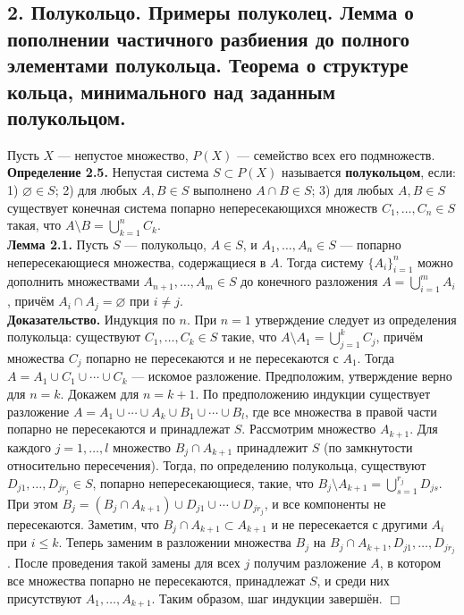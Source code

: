 \documentclass[12pt]{article}
\begin{document}
\subsection*{2. Полукольцо. Примеры полуколец. Лемма о пополнении частичного разбиения до
полного элементами полукольца. Теорема о структуре кольца, минимального над
заданным полукольцом.}
Пусть $X$ — непустое множество, $P(X)$ — семейство всех его подмножеств. \\\textbf{Определение 2.5.} Непустая система $S \subset P(X)$ называется \textbf{полукольцом}, если: 1) $\varnothing \in S$; 2) для любых $A, B \in S$ выполнено $A \cap B \in S$; 3) для любых $A, B \in S$ существует конечная система попарно непересекающихся множеств $C_1, \ldots, C_n \in S$ такая, что $A \setminus B = \bigcup_{k=1}^{n} C_k$. \\\textbf{Лемма 2.1.} Пусть $S$ — полукольцо, $A \in S$, и $A_1, \ldots, A_n \in S$ — попарно непересекающиеся множества, содержащиеся в $A$. Тогда систему $\{A_i\}_{i=1}^{n}$ можно дополнить множествами $A_{n+1}, \ldots, A_m \in S$ до конечного разложения $A = \bigcup_{i=1}^{m} A_i$, причём $A_i \cap A_j = \varnothing$ при $i \ne j$. \\\textbf{Доказательство.} Индукция по $n$. При $n = 1$ утверждение следует из определения полукольца: существуют $C_1, \ldots, C_k \in S$ такие, что $A \setminus A_1 = \bigcup_{j=1}^{k} C_j$, причём множества $C_j$ попарно не пересекаются и не пересекаются с $A_1$. Тогда $A = A_1 \cup C_1 \cup \cdots \cup C_k$ — искомое разложение. Предположим, утверждение верно для $n = k$. Докажем для $n = k + 1$. По предположению индукции существует разложение $A = A_1 \cup \cdots \cup A_k \cup B_1 \cup \cdots \cup B_l$, где все множества в правой части попарно не пересекаются и принадлежат $S$. Рассмотрим множество $A_{k+1}$. Для каждого $j = 1, \ldots, l$ множество $B_j \cap A_{k+1}$ принадлежит $S$ (по замкнутости относительно пересечения). Тогда, по определению полукольца, существуют $D_{j1}, \ldots, D_{jr_j} \in S$, попарно непересекающиеся, такие, что $B_j \setminus A_{k+1} = \bigcup_{s=1}^{r_j} D_{js}$. При этом $B_j = (B_j \cap A_{k+1}) \cup D_{j1} \cup \cdots \cup D_{jr_j}$, и все компоненты не пересекаются. Заметим, что $B_j \cap A_{k+1} \subset A_{k+1}$ и не пересекается с другими $A_i$ при $i \le k$. Теперь заменим в разложении множества $B_j$ на $B_j \cap A_{k+1}, D_{j1}, \ldots, D_{jr_j}$. После проведения такой замены для всех $j$ получим разложение $A$, в котором все множества попарно не пересекаются, принадлежат $S$, и среди них присутствуют $A_1, \ldots, A_{k+1}$. Таким образом, шаг индукции завершён. \hfill $\Box$ 
\end{document}
